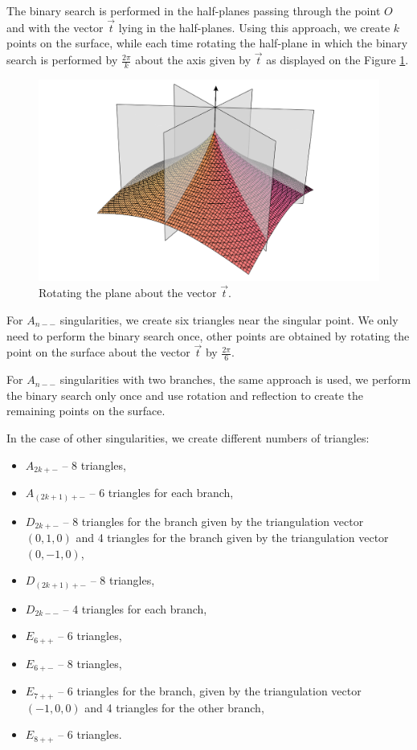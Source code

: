 The binary search is performed in the half-planes passing through the point
$O$ and with the vector $\vec{t}$ lying in the half-planes.
Using this approach, we create $k$ points on the surface, while each time
rotating the half-plane in which the binary search is performed by $\frac{2\pi}{k}$
about the axis given by $\vec{t}$ as displayed on the Figure \ref{img:rotating-planes}.

\begin{figure}
    \centerline{\includegraphics[scale=0.3]{images/rotating-planes}}
    \caption[Rotating the plane about the vector]
    {Rotating the plane about the vector $\vec{t}$.}
    \label{img:rotating-planes}
\end{figure}

For $A_{n--}$ singularities, we create six
triangles near the singular point. We only need to perform the binary search once,
other points are obtained by rotating the point on the surface about the vector 
$\vec{t}$ by $\frac{2 \pi}{6}$.

For $A_{n--}$ singularities with two branches, the same approach is used,
we perform the binary search only once and use rotation and
reflection to create the remaining points on the surface.

In the case of other singularities, we create different numbers of triangles:
\begin{itemize}
    \item $A_{2k+-}$ -- 8 triangles,
    \item $A_{(2k+1)+-}$ -- 6 triangles for each branch,
    \item $D_{2k+-}$ -- 8 triangles for the branch given by the 
    triangulation vector $(0,1,0)$ and 4 triangles for the branch
    given by the triangulation vector $(0,-1,0)$,
    \item $D_{(2k+1)+-}$ -- 8 triangles,
    \item $D_{2k--}$ -- 4 triangles for each branch,
    \item $E_{6++}$ -- 6 triangles,
    \item $E_{6+-}$ -- 8 triangles,
    \item $E_{7++}$ -- 6 triangles for the branch, given by the
    triangulation vector $(-1, 0, 0)$ and 4 triangles for the other
    branch,
    \item $E_{8++}$ -- 6 triangles.
\end{itemize}

